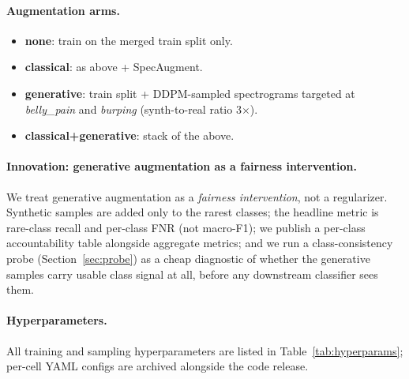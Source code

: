 \documentclass[10pt]{article}
\begin{document}
\paragraph{Augmentation arms.}
\begin{itemize}
\item \textbf{none}: train on the merged train split only.
\item \textbf{classical}: as above + SpecAugment.
\item \textbf{generative}: train split + DDPM-sampled spectrograms targeted at \textit{belly\_pain} and \textit{burping} (synth-to-real ratio 3$\times$).
\item \textbf{classical+generative}: stack of the above.
\end{itemize}

\paragraph{Innovation: generative augmentation as a fairness intervention.} We treat generative augmentation as a \emph{fairness intervention}, not a regularizer. Synthetic samples are added only to the rarest classes; the headline metric is rare-class recall and per-class FNR (not macro-F1); we publish a per-class accountability table alongside aggregate metrics; and we run a class-consistency probe (Section~\ref{sec:probe}) as a cheap diagnostic of whether the generative samples carry usable class signal at all, before any downstream classifier sees them.

\paragraph{Hyperparameters.} All training and sampling hyperparameters are listed in Table~\ref{tab:hyperparams}; per-cell YAML configs are archived alongside the code release.
\end{document}
